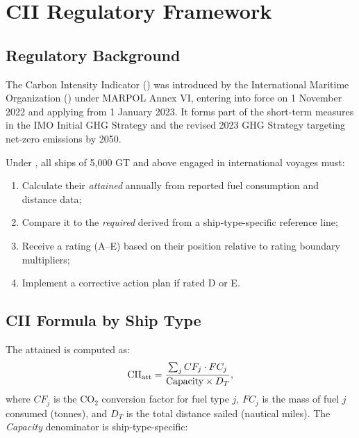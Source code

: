\section{CII Regulatory Framework}
\label{app:cii}

\subsection{Regulatory Background}
\label{app:cii:background}

The Carbon Intensity Indicator (\CII{}) was introduced by the International
Maritime Organization (\IMO{}) under MARPOL Annex VI, entering into force on
1 November 2022 and applying from 1 January 2023.  It forms part of the
short-term measures in the IMO Initial GHG Strategy and the revised 2023 GHG
Strategy targeting net-zero emissions by 2050.

Under \CII{}, all ships of 5{,}000 GT and above engaged in international
voyages must:
\begin{enumerate}
  \item Calculate their \emph{attained \CII{}} annually from reported fuel
    consumption and distance data;
  \item Compare it to the \emph{required \CII{}} derived from a
    ship-type-specific reference line;
  \item Receive a rating (A--E) based on their position relative to rating
    boundary multipliers;
  \item Implement a corrective action plan if rated D or E.
\end{enumerate}

\subsection{CII Formula by Ship Type}
\label{app:cii:formula}

The attained \CII{} is computed as:
\begin{equation}
  \mathrm{CII}_{\mathrm{att}} = \frac{\sum_j CF_j \cdot FC_j}{\text{Capacity} \times D_T},
  \label{eq:cii_general}
\end{equation}
where $CF_j$ is the CO$_2$ conversion factor for fuel type $j$, $FC_j$ is
the mass of fuel $j$ consumed (tonnes), and $D_T$ is the total distance
sailed (nautical miles).  The \emph{Capacity} denominator is
ship-type-specific:

